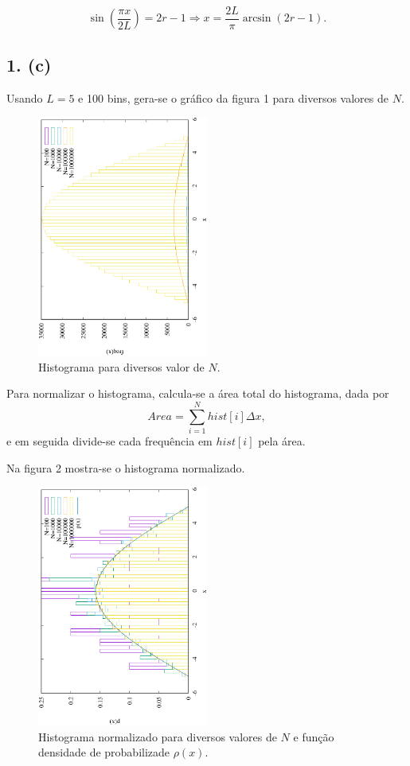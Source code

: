 \documentclass[brazilian, 12pt, a4paper, final]{article}
\begin{document}
\begin{equation*}
	\sin\left(\frac{\pi x}{2L}\right)=2r-1\Rightarrow x=\frac{2L}{\pi}\arcsin(2r-1).
\end{equation*}
	
\subsection*{1. (c)}
Usando $L=5$ e 100 bins, gera-se o gráfico da figura 1 para diversos valores de $N$.

\begin{figure}[htbp]
  \centering
  \includegraphics[width=0.5\textwidth,angle=-90]{Q1/HistQ1.eps}
  \caption{Histograma para diversos valor de $N$.}
\end{figure}

Para normalizar o histograma, calcula-se a área total do histograma, dada por
\begin{equation}
	Area=\sum_{i=1}^{N}hist[i]\Delta x,
\end{equation} 
e em seguida divide-se cada frequência em $hist[i]$ pela área.

Na figura 2 mostra-se o histograma normalizado.

\begin{figure}[htbp]
  \centering
  \includegraphics[width=0.5\textwidth,angle=-90]{Q1/NormQ1.eps}
  \caption{Histograma normalizado para diversos valores de $N$ e função densidade de probabilizade $\rho(x)$.}
\end{figure}
\end{document}
